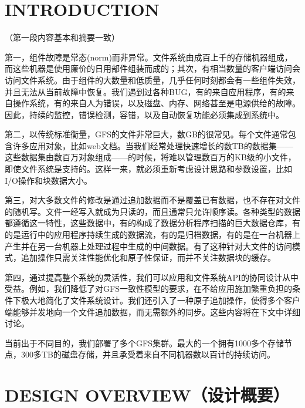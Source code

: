 \documentclass{article}
\begin{document}
\section{INTRODUCTION}
（第一段内容基本和摘要一致）\par
第一，组件故障是常态(norm)而非异常。文件系统由成百上千的存储机器组成，而这些机器是使用廉价的日用部件组装而成的；其次，有相当数量的客户端访问会访问文件系统。由于组件的大数量和低质量，几乎任何时刻都会有一些组件失效，并且无法从当前故障中恢复。我们遇到过各种BUG，有的来自应用程序，有的来自操作系统，有的来自人为错误，以及磁盘、内存、网络甚至是电源供给的故障。因此，持续的监控，错误检测，容错，以及自动恢复功能必须集成到系统中。\par
第二，以传统标准衡量，GFS的文件非常巨大，数GB的很常见。每个文件通常包含许多应用对象，比如web文档。当我们经常处理快速增长的数TB的数据集——这些数据集由数百万对象组成——的时候，将难以管理数百万的KB级的小文件，即使文件系统是支持的。这样一来，就必须重新考虑设计思路和参数设置，比如I/O操作和块数据大小。\par
第三，对大多数文件的修改是通过追加数据而不是覆盖已有数据，也不存在对文件的随机写。文件一经写入就成为只读的，而且通常只允许顺序读。各种类型的数据都遵循这一特性，这些数据中，有的构成了数据分析程序扫描的巨大数据仓库，有的是运行中的应用程序持续生成的数据流，有的是归档数据，有的是在一台机器上产生并在另一台机器上处理过程中生成的中间数据。有了这种针对大文件的访问模式，追加操作只需关注性能优化和原子性保证，而并不关注数据块的缓存。\par
第四，通过提高整个系统的灵活性，我们可以应用和文件系统API的协同设计从中受益。例如，我们降低了对GFS一致性模型的要求，在不给应用施加繁重负担的条件下极大地简化了文件系统设计。我们还引入了一种原子追加操作，使得多个客户端能够并发地向一个文件追加数据，而无需额外的同步。这些内容将在下文中详细讨论。\par
当前出于不同目的，我们部署了多个GFS集群。最大的一个拥有1000多个存储节点，300多TB的磁盘存储，并且承受着来自不同机器数以百计的持续访问。

\section{DESIGN OVERVIEW（设计概要）}
\end{document}
